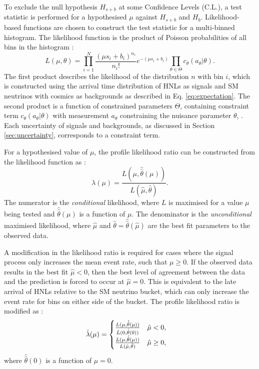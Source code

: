 To exclude the null hypothesis $H_{s+b}$ at some Confidence Levels (C.L.), a test statistic is performed for a hypothesised $\mu$ against $H_{s+b}$ and $H_{b}$.
Likelihood-based functions are chosen to construct the test statistic for a multi-binned histogram.
The likelihood function is the product of Poisson probabilities of all bins in the histogram \cite{asymptotic_test}:
\begin{equation}
\label{eq:LLH_func}
    L(\mu, \theta) =  \prod_{i=1}^{N} \frac{(\mu s_i + b_i)^{n_i}}{n_i!} e^{-(\mu s_i + b_i)}  \prod_{\theta\in\Theta} c_\theta(a_\theta|\theta).
\end{equation}
The first product describes the likelihood of the distribution $n$ with bin $i$, which is constructed using the arrival time distribution of HNLs as signals and SM neutrinos with cosmics as backgrounds as described in Eq. \ref{eq:expectation}. 
The second product is a function of constrained parameters $\Theta$, containing constraint term $c_\theta(a_\theta|\theta)$ with measurement $a_\theta$ constraining the nuisance parameter $\theta$, 	.
Each uncertainty of signals and backgrounds, as discussed in Section \ref{sec:uncertainty}, corresponds to a constraint term. 

For a hypothesised value of $\mu$, the profile likelihood ratio can be constructed from the likelihood function as \cite{asymptotic_test}:
\begin{equation}
\label{eq:likelihood_ratio}
    \lambda(\mu) = \frac{L(\mu, \hat{\hat{\theta}}(\mu))}{L(\hat{\mu},\hat{\theta})}.
\end{equation}
The numerator is the \textit{conditional} likelihood, where $L$ is maximised for a value $\mu$ being tested and $\hat{\hat{\theta}}(\mu)$ is a function of $\mu$.
The denominator is the \textit{unconditional} maximised likelihood, where $\hat{\mu}$ and $\hat{\theta} = \hat{\hat{\theta}}(\hat{\mu})$ are the best fit parameters to the observed data.

A modification in the likelihood ratio is required for cases where the signal process only increases the mean event rate, such that $\mu \geq 0$.
If the observed data results in the best fit $\hat{\mu} < 0$, then the best level of agreement between the data and the prediction is forced to occur at $\hat{\mu} = 0$.
This is equivalent to the late arrival of HNLs relative to the SM neutrino bucket, which can only increase the event rate for bins on either side of the bucket.
The profile likelihood ratio is modified as \cite{asymptotic_test}:
\begin{equation}
    \Tilde{\lambda}(\mu) =
    \begin{cases}
        \frac{L(\mu, \hat{\hat{\theta}}(\mu) )}{L(0, \hat{\hat{\theta}} (0))}\ \ \ \hat{\mu} < 0, \\
        \frac{L(\mu, \hat{\hat{\theta}}(\mu) )}{L(\hat{\mu}, \hat{\theta})}\ \ \ \hat{\mu} \geq 0, \\
    \end{cases}
\end{equation}
where $\hat{\hat{\theta}} (0)$ is a function of $\mu = 0$. 

